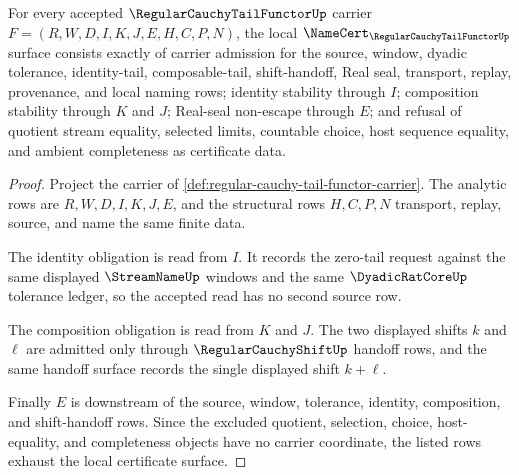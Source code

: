 \begin{theorem}
\label{thm:regular-cauchy-tail-functor-namecert-obligations}
For every accepted $\RegularCauchyTailFunctorUp$ carrier $F=(R,W,D,I,K,J,E,H,C,P,N)$, the local $\NameCert_{\RegularCauchyTailFunctorUp}$ surface consists exactly of carrier admission for the source, window, dyadic tolerance, identity-tail, composable-tail, shift-handoff, Real seal, transport, replay, provenance, and local naming rows; identity stability through $I$; composition stability through $K$ and $J$; Real-seal non-escape through $E$; and refusal of quotient stream equality, selected limits, countable choice, host sequence equality, and ambient completeness as certificate data.
\end{theorem}
\begin{proof}
Project the carrier of \autoref{def:regular-cauchy-tail-functor-carrier}. The analytic rows are $R,W,D,I,K,J,E$, and the structural rows $H,C,P,N$ transport, replay, source, and name the same finite data.

The identity obligation is read from $I$. It records the zero-tail request against the same displayed $\StreamNameUp$ windows and the same $\DyadicRatCoreUp$ tolerance ledger, so the accepted read has no second source row.

The composition obligation is read from $K$ and $J$. The two displayed shifts $k$ and $\ell$ are admitted only through $\RegularCauchyShiftUp$ handoff rows, and the same handoff surface records the single displayed shift $k+\ell$.

Finally $E$ is downstream of the source, window, tolerance, identity, composition, and shift-handoff rows. Since the excluded quotient, selection, choice, host-equality, and completeness objects have no carrier coordinate, the listed rows exhaust the local certificate surface.
\end{proof}

